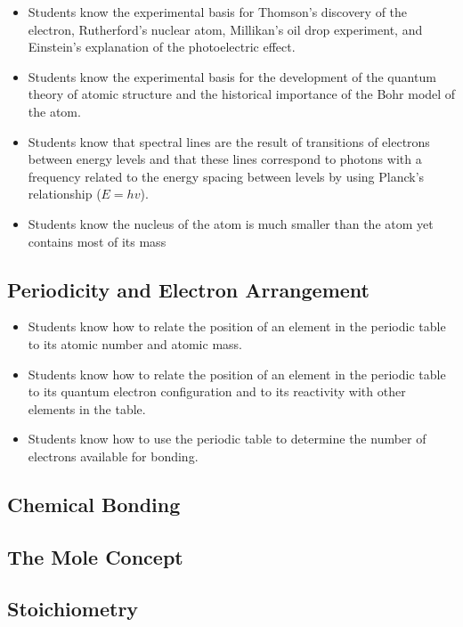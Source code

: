 \documentclass[12pt]{article}
\begin{document}
\begin{itemize}
    \item Students know the experimental basis for Thomson's discovery of the electron, Rutherford's nuclear atom, Millikan's oil drop experiment, and Einstein's explanation of the photoelectric effect.
    \item Students know the experimental basis for the development of the quantum theory of atomic structure and the historical importance of the Bohr model of the atom.
    \item Students know that spectral lines are the result of transitions of electrons between energy levels and that these lines correspond to photons with a frequency related to the energy spacing between levels by using Planck's relationship ($E = hv$).
    \item Students know the nucleus of the atom is much smaller than the atom yet contains most of its mass
\end{itemize}


\subsection{Periodicity and Electron Arrangement}

\begin{itemize}
    \item Students know how to relate the position of an element in the periodic table to its atomic number and atomic mass.
    \item Students know how to relate the position of an element in the periodic table to its quantum electron configuration and to its reactivity with other elements in the table.
    \item Students know how to use the periodic table to determine the number of electrons available for bonding.
\end{itemize}

\subsection{Chemical Bonding}

\subsection{The Mole Concept}

\subsection{Stoichiometry}
\end{document}

